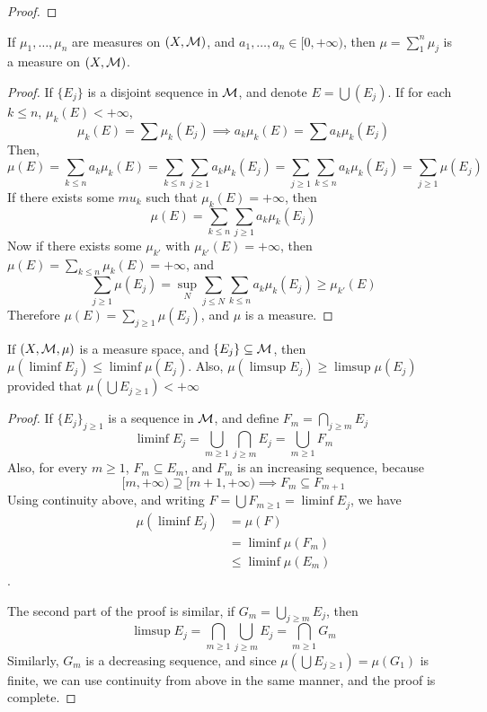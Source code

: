 \documentclass[../../main.tex]{subfiles}
\begin{document}
\begin{wts}
    
\end{wts}
\begin{proof}
    
\end{proof}
\newpage



\begin{wts}
    If $\mu_1,\ldots,\mu_n$ are measures on $(X,\mathcal{M})$, and $a_1,\ldots, a_n\in[0,+\infty)$, then $\mu = \sum^n_1\mu_j$ is a measure on $(X,\mathcal{M})$.
\end{wts}
\begin{proof}
    If $\{E_j\}$ is a disjoint sequence in $\mathcal{M}$, and denote $E = \bigcup (E_j)$. If for each $k\leq n$, $\mu_k(E)<+\infty$, 
    \[
    \mu_k(E)=\sum \mu_k(E_j)\implies a_k\mu_k(E)=\sum a_k\mu_k(E_j)
    \]
    Then,
    \[
    \mu(E)=\sum_{k\leq n}a_k\mu_k(E)= \sum_{k\leq n}\sum_{j\geq 1}a_k\mu_k(E_j)=\sum_{j\geq 1}\sum_{k\leq n}a_k\mu_k(E_j)=\sum_{j\geq 1}\mu(E_j)
    \]
    If there exists some $mu_k$ such that $\mu_k(E) = +\infty$, then 
    \[
    \mu(E) = \sum_{k\leq n}\sum_{j\geq 1}a_k\mu_k(E_j)
    \]
    Now if there exists some $\mu_{k'}$ with $\mu_{k'}(E)=+\infty$, then $\mu(E)=\sum_{k\leq n}\mu_k(E)=+\infty$, and 
    \[
    \sum_{j\geq 1}\mu(E_j)=\sup_N\sum_{j\leq N} \sum_{k\leq n}a_k\mu_k(E_j)\geq \mu_{k'}(E)
    \]
    Therefore $\mu(E)=\sum_{j\geq 1}\mu(E_j)$, and $\mu$ is a measure.
\end{proof}
\newpage





\begin{wts}
    If $(X,\mathcal{M},\mu)$ is a measure space, and $\{E_j\}\subseteq \mathcal{M}$, then $\mu(\liminf E_j)\leq \liminf \mu(E_j)$. Also, $\mu(\limsup E_j)\geq \limsup \mu(E_j)$ provided that $\mu(\bigcup E_{j\geq 1})<+\infty$
\end{wts}
\begin{proof}
If $\{E_j\}_{j\geq 1}$ is a sequence in $\mathcal{M}$, and define $F_m = \bigcap_{j\geq m}E_j$
\[
\liminf E_j = \bigcup_{m\geq 1}\bigcap_{j\geq m}E_j = \bigcup_{m\geq 1} F_m
\]
Also, for every $m\geq 1$, $F_m\subseteq E_m$, and $F_m$ is an increasing sequence, because
\[
[m,+\infty)\supseteq [m+1,+\infty)\implies F_m\subseteq F_{m+1}
\]
Using continuity above, and writing $F = \bigcup F_{m\geq 1}=\liminf E_j$, we have
\begin{align*}
    \mu(\liminf E_j) &= \mu(F)\\
    &= \liminf \mu(F_m)\\
    &\leq \liminf \mu(E_m)
\end{align*}.

The second part of the proof is similar, if $G_m = \bigcup_{j\geq m} E_j$, then
\[
\limsup E_j = \bigcap_{m\geq 1}\bigcup_{j\geq m} E_j = \bigcap_{m\geq 1}G_m
\]
Similarly, $G_m$ is a decreasing sequence, and since $\mu(\bigcup E_{j\geq 1}) = \mu(G_1)$ is finite, we can use continuity from above in the same manner, and the proof is complete.
\end{proof}
\newpage
\end{document}
